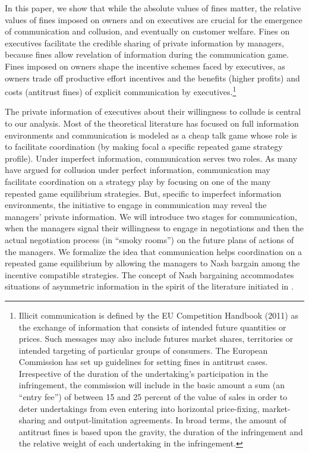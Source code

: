 \documentclass[]{article}
\begin{document}
In  this  paper, we show  that  while the absolute  values of fines matter, the relative values  of fines imposed on owners and on executives are crucial for the emergence of communication and collusion, and eventually on customer welfare. Fines on executives facilitate the credible sharing of private information by managers, because fines allow revelation of information during the communication game. Fines imposed on owners shape the incentive schemes faced by executives, as owners trade off productive effort incentives and the benefits (higher profits) and costs (antitrust fines) of explicit communication by executives.\footnote{%
Illicit communication is defined by the EU Competition Handbook (2011) as the exchange of information that consists of intended future quantities or prices. Such messages may also include futures market shares, territories or intended targeting of particular groups of consumers. The European Commission has set up guidelines for setting fines in antitrust cases. Irrespective of the duration of the undertaking's participation in the infringement, the commission will include in the basic amount a sum (an ``entry fee'') of between 15 and 25 percent of the value of sales in order to deter undertakings from even entering into horizontal price-fixing, market-sharing and output-limitation agreements. In broad terms, the amount of antitrust fines is based upon the gravity, the duration of the infringement and the relative weight of each undertaking in the infringement.}

The private information of executives about their willingness to collude is central to our analysis. Most of the theoretical literature has focused on full information environments and communication is modeled as a cheap talk game whose role is to facilitate coordination (by making focal a specific repeated game strategy profile). Under imperfect information, communication serves two roles. As many have argued for collusion under  perfect information, communication may facilitate coordination on a strategy play by focusing on one of the many repeated game equilibrium strategies. But, specific to imperfect information environments, the initiative to engage in communication may reveal the managers’ private information. We will introduce two stages for communication, when the managers signal their willingness to engage in negotiations and then the actual  negotiation  process (in “smoky  rooms”) on the future plans of actions of the managers. We formalize the idea that communication helps coordination on a repeated game equilibrium by allowing the managers to Nash bargain among the incentive compatible strategies. The concept of Nash bargaining accommodates situations of asymmetric information in the spirit of the literature initiated in \cite{Harsanyi1972}.
\end{document}
